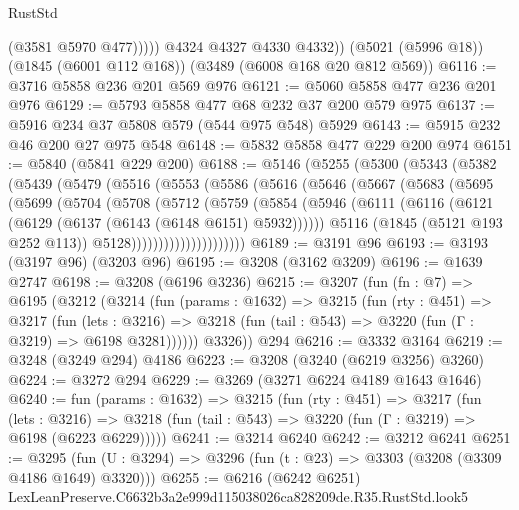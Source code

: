 \begin{lexlean}{RustStd}
\begin{coremodule}
                (@3581 @5970 @477)))))
        @4324
        @4327
        @4330
        @4332))
    (@5021 (@5996 @18))
    (@1845 (@6001 @112 @168))
    (@3489 (@6008 @168 @20 @812 @569))
@6116 := @3716 @5858 @236 @201 @569 @976
@6121 := @5060 @5858 @477 @236 @201 @976
@6129 := @5793 @5858 @477 @68 @232 @37 @200 @579 @975
@6137 := @5916 @234 @37 @5808 @579 (@544 @975 @548) @5929
@6143 := @5915 @232 @46 @200 @27 @975 @548
@6148 := @5832 @5858 @477 @229 @200 @974
@6151 := @5840 (@5841 @229 @200)
@6188 := @5146
    (@5255
      (@5300
        (@5343
          (@5382
            (@5439
              (@5479
                (@5516
                  (@5553
                    (@5586
                      (@5616
                        (@5646
                          (@5667
                            (@5683
                              (@5695
                                (@5699
                                  (@5704
                                    (@5708
                                      (@5712
                                        (@5759
                                          (@5854
                                            (@5946
                                              (@6111
                                                (@6116
                                                  (@6121
                                                    (@6129 (@6137 (@6143 (@6148 @6151) @5932))))))
                                              @5116
                                              (@1845 (@5121 @193 @252 @113))
                                              @5128)))))))))))))))))))))
@6189 := @3191 @96
@6193 := @3193 (@3197 @96) (@3203 @96)
@6195 := @3208 (@3162 @3209)
@6196 := @1639 @2747
@6198 := @3208 (@6196 @3236)
@6215 := @3207
    (fun (fn : @7) =>
    @6195
      (@3212
        (@3214
          (fun (params : @1632) =>
          @3215
            (fun (rty : @451) =>
            @3217
              (fun (lets : @3216) =>
              @3218 (fun (tail : @543) => @3220 (fun (Γ : @3219) => @6198 @3281))))))
        @3326))
    @294
@6216 := @3332 @3164
@6219 := @3248 (@3249 @294) @4186
@6223 := @3208 (@3240 (@6219 @3256) @3260)
@6224 := @3272 @294
@6229 := @3269 (@3271 @6224 @4189 @1643 @1646)
@6240 := fun (params : @1632) =>
  @3215
    (fun (rty : @451) =>
    @3217
      (fun (lets : @3216) =>
      @3218 (fun (tail : @543) => @3220 (fun (Γ : @3219) => @6198 (@6223 @6229)))))
@6241 := @3214 @6240
@6242 := @3212 @6241
@6251 := @3295 (fun (U : @3294) => @3296 (fun (t : @23) => @3303 (@3208 (@3309 @4186 @1649) @3320)))
@6255 := @6216 (@6242 @6251) LexLeanPreserve.C6632b3a2e999d115038026ca828209de.R35.RustStd.look5

\end{coremodule}
\end{lexlean}
